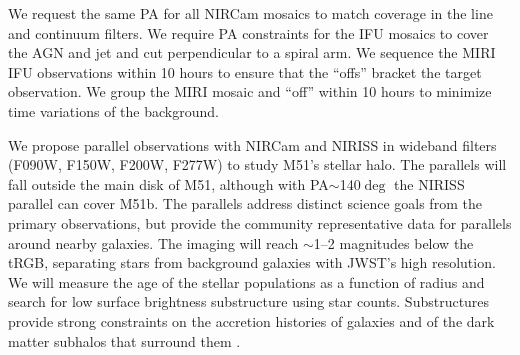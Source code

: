 \documentclass[12pt]{article}
\begin{document}
\specialreq             %
\vspace{-0.15in}
We request the same PA for all NIRCam mosaics to match coverage in the line and continuum filters.  We require PA constraints for the IFU mosaics to cover the AGN and jet and cut perpendicular to a spiral arm.  We sequence the MIRI IFU observations within 10 hours to ensure that the ``offs''  bracket the target observation. We group the MIRI mosaic and ``off'' within 10 hours to minimize time variations of the background.


%
\vspace{-0.1in}

\coordinatedobs %
\vspace{-0.15in}
We propose parallel observations with NIRCam and NIRISS in wideband filters (F090W, F150W, F200W, F277W) to study M51's stellar halo. The parallels will fall outside the main disk of M51, although with PA$\sim$140$\deg$
the NIRISS parallel can cover M51b. The parallels address distinct science goals from the primary observations, but provide the community representative data for parallels around nearby galaxies. The imaging will reach $\sim$1--2 magnitudes below the tRGB, separating stars from background galaxies with JWST's high resolution. We will measure the age of the stellar populations as a function of radius and search for low surface brightness substructure using star counts. Substructures provide strong constraints on the accretion histories of galaxies \citep{bullock2005,pillepich2014} and of the dark matter subhalos that surround them \citep{johnston1999}.
\end{document}
